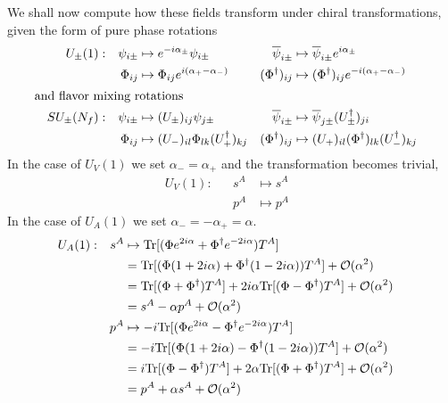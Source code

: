 We shall now compute how these fields transform under chiral transformations, given the form of pure phase rotations
\begin{subequations}
    \begin{align}
        &  & U_\pm(1): &  & \psi_{i\pm}             & \mapsto e^{-{i}\alpha_\pm}\psi_{i\pm}                                               &  \overline{\psi}_{i\pm}&\mapsto\overline{\psi}_{i\pm}e^{{i}\alpha_\pm}     &&                              \\
        &  & &  & \Phi_{ij}&\mapsto\Phi_{ij}e^{{i}(\alpha_+-\alpha_-)}                                              &  (\Phi^\dagger)_{ij}&\mapsto(\Phi^\dagger)_{ij}e^{-{i}(\alpha_+-\alpha_-)}     &&\\
        \intertext{and flavor mixing rotations}
        &  & SU_\pm(N_f): &  & \psi_{i\pm}             & \mapsto (U_\pm)_{ij}\psi_{j\pm}                                               &  \overline{\psi}_{i\pm}&\mapsto\overline{\psi}_{j\pm}(U^\dagger_\pm)_{ji}     &&                              \\
        &  & &  & \Phi_{ij}& \mapsto(U_-)_{il}\Phi_{lk}(U^\dagger_+)_{kj}                                               &  (\Phi^\dagger)_{ij}&\mapsto(U_+)_{il}(\Phi^\dagger)_{lk}(U^\dagger_-)_{kj}     &&
    \end{align}
\end{subequations}
In the case of $U_V(1)$ we set $\alpha_-=\alpha_+$ and the transformation becomes trivial,
\begin{subequations}
    \begin{align}
        &  & U_V(1): &  & s^A& \mapsto s^A&&&\\
        &  &&  &p^A& \mapsto p^A&&&
    \end{align}
\end{subequations}
In the case of $U_A(1)$ we set $\alpha_-=-\alpha_+=\alpha$.
\begin{subequations}
    \begin{align}
        &  & U_A(1): &  & s^A& \mapsto {\text{Tr}}[(\Phi e^{2{i}\alpha}+\Phi^\dagger e^{-2{i}\alpha})T^A]&&&\\
        &  &&  & & = {\text{Tr}}[(\Phi (1+2{i}\alpha)+\Phi^\dagger (1-2{i}\alpha))T^A]+\mathcal{O}(\alpha^2)&&&\\
        &  &&  & & = {\text{Tr}}[(\Phi+\Phi^\dagger)T^A]+2{i}\alpha{\text{Tr}}[(\Phi-\Phi^\dagger)T^A]+\mathcal{O}(\alpha^2)&&&\\
        &  &&  & & = s^A-\alpha p^A+\mathcal{O}(\alpha^2)&&&\\
        &  & &  & p^A& \mapsto -{i}{\text{Tr}}[(\Phi e^{2{i}\alpha}-\Phi^\dagger e^{-2{i}\alpha})T^A]&&&\\
        &  &&  & & = -{i}{\text{Tr}}[(\Phi (1+2{i}\alpha)-\Phi^\dagger (1-2{i}\alpha))T^A]+\mathcal{O}(\alpha^2)&&&\\
        &  &&  & & = {i}{\text{Tr}}[(\Phi-\Phi^\dagger)T^A]+2\alpha{\text{Tr}}[(\Phi+\Phi^\dagger)T^A]+\mathcal{O}(\alpha^2)&&&\\
        &  &&  & & = p^A+\alpha s^A+\mathcal{O}(\alpha^2)&&&
    \end{align}
\end{subequations}
